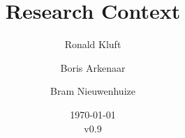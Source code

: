 \documentclass{article}
\begin{document}
 

\title{Research Context}
\author{Ronald Kluft \and Boris Arkenaar \and Bram Nieuwenhuize}
\date{\today\\v0.9}
\maketitle 





\printglossaries
\end{document}
